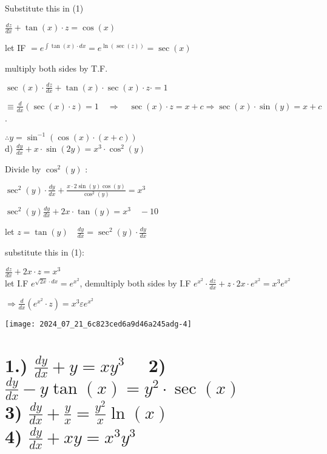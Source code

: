 Substitute this in (1)

$\frac{d z}{d x}+\tan(x) \cdot z=\cos(x)$

let IF $=e^{\int \tan(x) \cdot d x}=e^{\ln (\sec (z))}=\sec (x)$

multiply both sides by T.F.

$\sec (x) \cdot \frac{d z}{d x}+\tan(x) \cdot \sec (x) \cdot z \cdot=1$

$\equiv \frac{d}{d x}(\sec (x) \cdot z)=1 \quad \Rightarrow \quad \sec (x) \cdot z=x+c \Rightarrow \sec (x) \cdot \sin(y)=x+c$.

$\therefore y=\sin ^{-1}(\cos(x) \cdot(x+c))$\\
d) $\frac{d y}{d x}+x \cdot \sin(2 y)=x^{3} \cdot \cos ^{2}(y)$

Divide by $\cos ^{2}(y)$ :

$\sec ^{2}(y) \cdot \frac{d y}{d x}+\frac{x \cdot 2 \sin(y) \cos(y)}{\cos ^{2}(y)}=x^{3}$

$\sec ^{2}(y) \frac{d y}{d x}+2 x \cdot \tan(y)=x^{3} \quad-10$

let $z=\tan(y) \quad \frac{d y}{d x}=\sec ^{2}(y) \cdot \frac{d y}{d x}$

substitute this in (1):

$\frac{d z}{d x}+2 x \cdot z=x^{3}$\\
let I.F $e^{\sqrt{2 x} \cdot d x}=e^{x^2 }$, demultiply both sides by I.F $e^{x^2 } \cdot \frac{d z}{d x}+z \cdot 2 x \cdot e^{x^2 }=x^{3} e^{x^2 }$

$\Rightarrow \frac{d}{d x}\left(e^{x^2 } \cdot z\right)=x^{3} \varepsilon e^{x^2 }$

\begin{center}
	\texttt{[image: 2024\_07\_21\_6c823ced6a9d46a245adg-4]}
\end{center}

\section*{1.) $\frac{d y}{d x}+y=x y^{3} \quad$ 2) $\frac{d y}{d x}-y \tan(x)=y^2 \cdot \sec (x)$ \\
3) $\frac{d y}{d x}+\frac{y}{x}=\frac{y^2}{x} \ln (x)$ \\
4) $\frac{d y}{d x}+x y=x^{3} y^{3}$}
